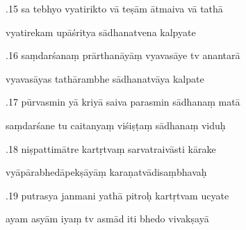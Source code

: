 \documentclass[article,12pt,a4paper]{memoir}%
\newcounter{parCount}
\begin{document}
	  
	  \pstart {}.15 sa tebhyo vyatirikto vā teṣām ātmaiva vā tathā 
	{}
	\pend%
      

	  
	  \pstart \leavevmode%
	vyatirekam upāśritya sādhanatvena kalpyate 
	{}
	\pend%
      

	  
	  \pstart {}.16 saṃdarśanaṃ prārthanāyāṃ vyavasāye tv anantarā 
	{}
	\pend%
      

	  
	  \pstart \leavevmode%
	vyavasāyas tathārambhe sādhanatvāya kalpate 
	{}
	\pend%
      

	  
	  \pstart {}.17 pūrvasmin yā kriyā saiva parasmin sādhanaṃ matā 
	{}
	\pend%
      

	  
	  \pstart \leavevmode%
	saṃdarśane tu caitanyaṃ viśiṣṭaṃ sādhanaṃ viduḥ 
	{}
	\pend%
      

	  
	  \pstart {}.18 niṣpattimātre kartṛtvaṃ sarvatraivāsti kārake 
	{}
	\pend%
      

	  
	  \pstart \leavevmode%
	vyāpārabhedāpekṣāyāṃ karaṇatvādisaṃbhavaḥ 
	{}
	\pend%
      

	  
	  \pstart {}.19 putrasya janmani yathā pitroḥ kartṛtvam ucyate 
	{}
	\pend%
      

	  
	  \pstart \leavevmode%
	ayam asyām iyaṃ tv asmād iti bhedo vivakṣayā 
	{}
	\pend%
      
\end{document}
